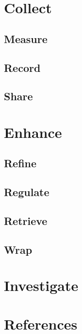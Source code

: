 \documentclass[12pt,a4paper]{article}
\begin{document}
\section{Collect}

\subsection{Measure}

\subsection{Record}

\subsection{Share}

\section{Enhance}

\subsection{Refine}

\subsection{Regulate}

\subsection{Retrieve}

\subsection{Wrap}

\section{Investigate}




\section*{References}

\end{document}
